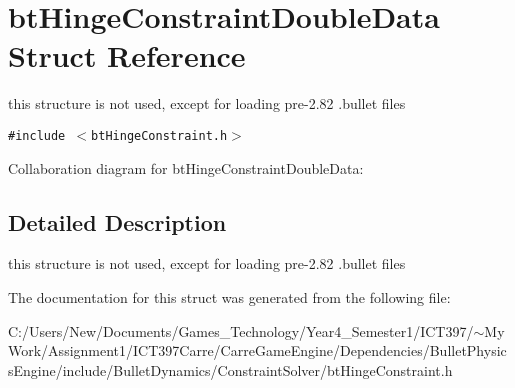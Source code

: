 \hypertarget{structbt_hinge_constraint_double_data}{
\section{btHingeConstraintDoubleData Struct Reference}
\label{structbt_hinge_constraint_double_data}
}
this structure is not used, except for loading pre-2.82 .bullet files  


{\tt \#include $<$btHingeConstraint.h$>$}

Collaboration diagram for btHingeConstraintDoubleData:

\subsection{Detailed Description}
this structure is not used, except for loading pre-2.82 .bullet files 

The documentation for this struct was generated from the following file:\begin{CompactItemize}
\item 
C:/Users/New/Documents/Games\_\-Technology/Year4\_\-Semester1/ICT397/$\sim$My Work/Assignment1/ICT397Carre/CarreGameEngine/Dependencies/BulletPhysicsEngine/include/BulletDynamics/ConstraintSolver/btHingeConstraint.h\end{CompactItemize}

